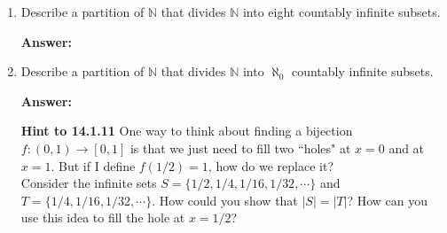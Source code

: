 \documentclass[11pt]{report}
\theoremstyle{plain}
\newcommand{\N}{\mathbb{N}}
\begin{document}
\begin{enumerate}
\item[\textbf{14.2.11}] Describe a partition of $\N$ that divides $\N$ into eight countably infinite subsets.

\textbf{Answer:} \\

\vspace{1in}

\item[\textbf{14.2.12}] Describe a partition of $\N$ that divides $\N$ into $\aleph_0$ countably infinite subsets.

\textbf{Answer:} \\

\vspace{1in}


\textbf{Hint to 14.1.11} One way to think about finding a bijection $f: (0,1) \to [0,1]$ is that we just need to fill two ``holes" at $x=0$ and at $x=1.$ But if I define $f(1/2)=1$, how do we replace it? \\

Consider the infinite sets $S=\{1/2, 1/4, 1/16, 1/32, \cdots \}$ and $T=\{1/4, 1/16, 1/32, \cdots \}.$ How could you show that $|S|=|T|$? How can you use this idea to fill the hole at $x=1/2$?
\end{enumerate}
\end{document}
